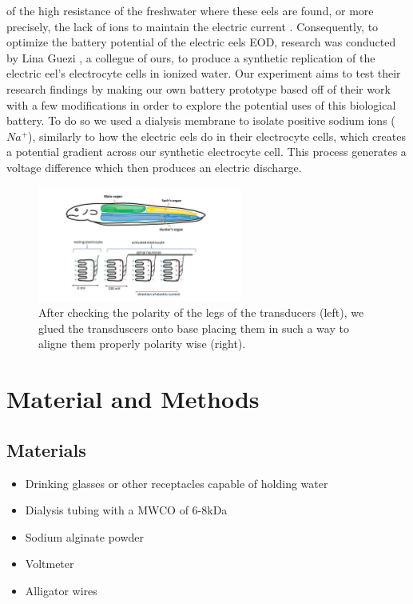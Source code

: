 \documentclass[letterpaper]{article}
\begin{document}
of the high resistance of the freshwater where these eels are found, or more precisely, the lack of 
ions to maintain the electric current \parencite{boisseletBiomimeticPotentialElectric2017}. 
Consequently, to optimize the battery potential of the electric eels EOD, research was conducted 
by Lina Guezi \parencite{gueziTheoreticalExaminationConception2023}, a collegue of ours, to produce 
a synthetic replication of the electric eel’s electrocyte 
cells in ionized water. Our experiment aims to test their research findings by making our own battery prototype based off of their work with a few modifications in order to explore 
the potential uses of this biological battery. To do so we used a dialysis membrane to isolate positive sodium ions ( $Na^+$), similarly to how the electric eels do in their
electrocyte cells, which creates a potential gradient across our synthetic electrocyte cell. This process generates a voltage difference 
which then produces an electric discharge. 

\begin{figure}[H]
	\centering
	\includegraphics[width=0.60\textwidth]{fig1.jpg}
	\caption{After checking the polarity of the legs of the transducers (left), we glued the transduscers onto base placing them in such a way to aligne them properly polarity wise (right). }
	\label{fig:2}
\end{figure}

\section{Material and Methods}
\label{sec:matandmet}

\subsection*{Materials}

\begin{itemize}
	\item Drinking glasses or other receptacles capable of holding water
	\item Dialysis tubing with a MWCO of 6-8kDa
	\item Sodium alginate powder
	\item Voltmeter
	\item Alligator wires
\end{itemize}
\end{document}
